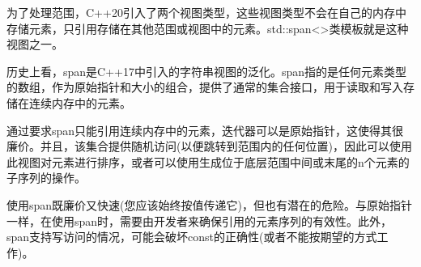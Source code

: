 为了处理范围，C++20引入了两个视图类型，这些视图类型不会在自己的内存中存储元素，只引用存储在其他范围或视图中的元素。std::span<>类模板就是这种视图之一。

历史上看，span是C++17中引入的字符串视图的泛化。span指的是任何元素类型的数组，作为原始指针和大小的组合，提供了通常的集合接口，用于读取和写入存储在连续内存中的元素。

通过要求span只能引用连续内存中的元素，迭代器可以是原始指针，这使得其很廉价。并且，该集合提供随机访问(以便跳转到范围内的任何位置)，因此可以使用此视图对元素进行排序，或者可以使用生成位于底层范围中间或末尾的n个元素的子序列的操作。

使用span既廉价又快速(您应该始终按值传递它)，但也有潜在的危险。与原始指针一样，在使用span时，需要由开发者来确保引用的元素序列的有效性。此外，span支持写访问的情况，可能会破坏const的正确性(或者不能按期望的方式工作)。